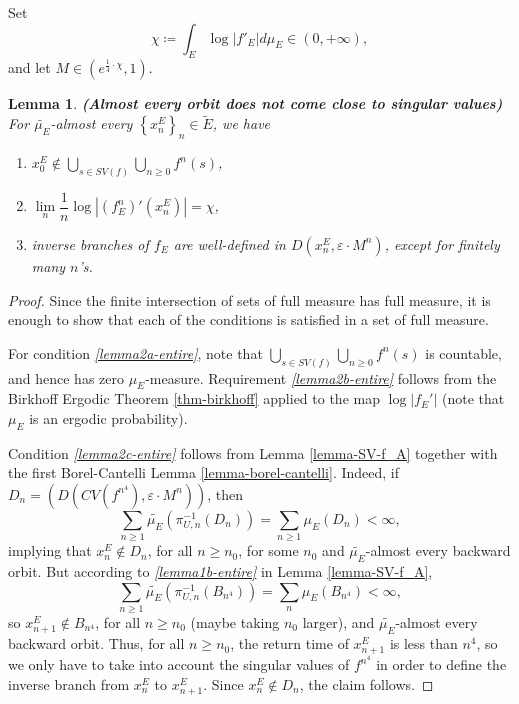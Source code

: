 \documentclass[11pt]{article}
\newtheorem{sublemma}[claim]{Lemma}
\theoremstyle{definition}
\theoremstyle{remark}
\theoremstyle{plain}
\begin{document}
		
		Set \[\chi \coloneqq \int_{E} \log \left| f'_{E}\right| d\mu_E \in (0, +\infty), \] and let $ M\in (e^{\frac{1}{4}\cdot\chi}, 1) $.
\begin{sublemma}{\bf (Almost every orbit does not come close to singular values) }
	For $ \widetilde{\mu_E} $-almost every $ \left\lbrace x^E_n\right\rbrace _n\in\widetilde{E} $, we have \begin{enumerate}[label={\em (3.\arabic*)}]
		\item\label{lemma2a-entire} $ x^E_0 \notin \bigcup\limits_{s\in SV(f)} \bigcup\limits_{n\geq0}f^n(s)$,
		\item\label{lemma2b-entire} $ \lim\limits_{n}\dfrac{1}{n}\log \left| (f_{E}^n)'(x^E_n)\right| =\chi$,
		\item\label{lemma2c-entire} inverse branches of $ f_{E} $ are well-defined in $ D(x^E_n, \varepsilon\cdot M^n) $, except for finitely many $ n $'s.
	\end{enumerate}
\end{sublemma}
\begin{proof} Since the finite intersection of sets of full measure has full measure, it is enough to show that each of the conditions is satisfied in a set of full measure.
	
	For condition {\em\ref{lemma2a-entire}}, note that $ \bigcup_{s\in SV(f)} \bigcup_{n\geq0}f^n(s) $ is countable, and hence has zero $ \mu_E$-measure.
	Requirement {\em\ref{lemma2b-entire}} follows from the Birkhoff Ergodic Theorem \ref{thm-birkhoff} applied to the map $ \log \left| f_{E}'\right| $ (note that $ \mu_E$ is an ergodic probability). 
	
	
	Condition {\em\ref{lemma2c-entire}} follows from Lemma \ref{lemma-SV-f_A} together with the first Borel-Cantelli Lemma \ref{lemma-borel-cantelli}. Indeed,    if 
$ D_n=(D(CV(f^{n^4}),\varepsilon\cdot  M^n)) $, then
\[\sum_{n\geq 1}\widetilde{\mu_E}(\pi_{U,n}^{-1}(D_n))=\sum_{n\geq 1}\mu_E(D_n)<\infty,\] implying that $ x^E_{n}\notin D_n $, for all $ n\geq n_0 $, for some $ n_0 $ and $ \widetilde{ \mu_E} $-almost every backward orbit. But according to {\em \ref{lemma1b-entire}} in Lemma \ref{lemma-SV-f_A}, \[\sum_{n\geq 1}\widetilde{\mu_E}(\pi_{U,n}^{-1}(B_{n^4}))=\sum\limits_{n} \mu_E(B_{n^4})<\infty,\] so $ x^E_{n+1}\notin B_{n^4}$, for all $ n\geq n_0 $ (maybe taking $ n_0 $ larger),  and $ \widetilde{ \mu_E} $-almost every backward orbit. Thus, for all $ n\geq n_0 $, the return time of $ x^E_{n+1} $ is less than $ n^4 $, so we only have to take into account the singular values of $ f^{n^4} $ in order to define the inverse branch from $ x^E_{n} $ to $ x^E_{n+1} $. Since  $ x^E_{n}\notin D_n $, the claim follows.
\end{proof}
\end{document}

